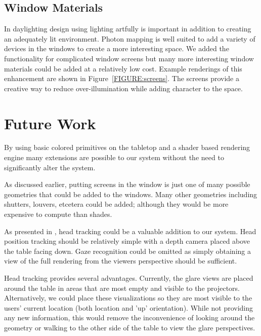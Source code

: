 \documentclass[10pt,twocolumn,letterpaper]{article}
\begin{document}


\subsection{Window Materials}

In daylighting design using lighting artfully is important in addition
to creating an adequately lit environment.  Photon mapping is well
suited to add a variety of devices in the windows to create a more
interesting space.  We added the functionality for complicated window
screens but many more interesting window materials could be added at a
relatively low cost.  Example renderings of this enhancement are shown
in Figure~\ref{FIGURE:screens}.  The screens provide a creative way to
reduce over-illumination while adding character to the space.


\section{Future Work}

By using basic colored primitives on the tabletop and a shader based
rendering engine many extensions are possible to our system without
the need to significantly alter the system.

As discussed earlier, putting screens in the window is just one of
many possible geometries that could be added to the windows.  Many
other geometries including shutters, louvers, etcetera could be added; 
although they would be more expensive to
compute than shades.

As presented in \cite{Garstka_Peters_2004}, head tracking could be a
valuable addition to our system.  Head position tracking should be
relatively simple with a depth camera placed above the table facing
down.  Gaze recognition could be omitted as simply obtaining a view of
the full rendering from the viewers perspective should be sufficient.

Head tracking provides several advantages.  Currently, the glare views
are placed around the table in areas that are most empty and visible
to the projectors.  Alternatively, we could place these visualizations
so they are most visible to the users' current location (both location
and 'up' orientation).
While not providing any new information, this would remove the
inconvenience of looking around the geometry or walking to the other
side of the table to view the glare perspectives.
\end{document}
